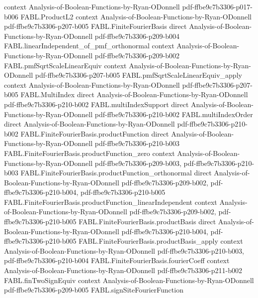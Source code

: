\begin{theorem}
  {context}
  {Analysis-of-Boolean-Functions-by-Ryan-ODonnell}
  {pdf-ffbe9c7b3306-p017-b006}
\proofstep
  {FABL.ProductL2}
  {context}
  {Analysis-of-Boolean-Functions-by-Ryan-ODonnell}
  {pdf-ffbe9c7b3306-p207-b005}
\proofstep
  {FABL.FiniteFourierBasis}
  {direct}
  {Analysis-of-Boolean-Functions-by-Ryan-ODonnell}
  {pdf-ffbe9c7b3306-p209-b004}
\proofstep
  {FABL.linearIndependent_of_pmf_orthonormal}
  {context}
  {Analysis-of-Boolean-Functions-by-Ryan-ODonnell}
  {pdf-ffbe9c7b3306-p209-b002}
\proofstep
  {FABL.pmfSqrtScaleLinearEquiv}
  {context}
  {Analysis-of-Boolean-Functions-by-Ryan-ODonnell}
  {pdf-ffbe9c7b3306-p207-b005}
\proofstep
  {FABL.pmfSqrtScaleLinearEquiv_apply}
  {context}
  {Analysis-of-Boolean-Functions-by-Ryan-ODonnell}
  {pdf-ffbe9c7b3306-p207-b005}
\proofstep
  {FABL.MultiIndex}
  {direct}
  {Analysis-of-Boolean-Functions-by-Ryan-ODonnell}
  {pdf-ffbe9c7b3306-p210-b002}
\proofstep
  {FABL.multiIndexSupport}
  {direct}
  {Analysis-of-Boolean-Functions-by-Ryan-ODonnell}
  {pdf-ffbe9c7b3306-p210-b002}
\proofstep
  {FABL.multiIndexOrder}
  {direct}
  {Analysis-of-Boolean-Functions-by-Ryan-ODonnell}
  {pdf-ffbe9c7b3306-p210-b002}
\proofstep
  {FABL.FiniteFourierBasis.productFunction}
  {direct}
  {Analysis-of-Boolean-Functions-by-Ryan-ODonnell}
  {pdf-ffbe9c7b3306-p210-b003}
\proofstep
  {FABL.FiniteFourierBasis.productFunction_zero}
  {context}
  {Analysis-of-Boolean-Functions-by-Ryan-ODonnell}
  {pdf-ffbe9c7b3306-p209-b003,
    pdf-ffbe9c7b3306-p210-b003}
\proofstep
  {FABL.FiniteFourierBasis.productFunction_orthonormal}
  {direct}
  {Analysis-of-Boolean-Functions-by-Ryan-ODonnell}
  {pdf-ffbe9c7b3306-p209-b002,
    pdf-ffbe9c7b3306-p210-b004,
    pdf-ffbe9c7b3306-p210-b005}
\proofstep
  {FABL.FiniteFourierBasis.productFunction_linearIndependent}
  {context}
  {Analysis-of-Boolean-Functions-by-Ryan-ODonnell}
  {pdf-ffbe9c7b3306-p209-b002,
    pdf-ffbe9c7b3306-p210-b005}
\proofstep
  {FABL.FiniteFourierBasis.productBasis}
  {direct}
  {Analysis-of-Boolean-Functions-by-Ryan-ODonnell}
  {pdf-ffbe9c7b3306-p210-b004,
    pdf-ffbe9c7b3306-p210-b005}
\proofstep
  {FABL.FiniteFourierBasis.productBasis_apply}
  {context}
  {Analysis-of-Boolean-Functions-by-Ryan-ODonnell}
  {pdf-ffbe9c7b3306-p210-b003,
    pdf-ffbe9c7b3306-p210-b004}
\proofstep
  {FABL.FiniteFourierBasis.fourierCoeff}
  {context}
  {Analysis-of-Boolean-Functions-by-Ryan-ODonnell}
  {pdf-ffbe9c7b3306-p211-b002}
\proofstep
  {FABL.finTwoSignEquiv}
  {context}
  {Analysis-of-Boolean-Functions-by-Ryan-ODonnell}
  {pdf-ffbe9c7b3306-p209-b005}
\proofstep
  {FABL.signSiteFourierFunction}

\end{theorem}
